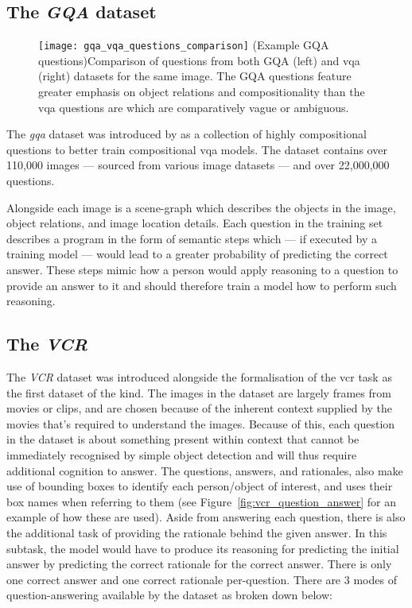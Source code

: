 \subsection{The \textit{GQA} dataset}
\label{subsec:gqa_dataset}

\begin{figure}[htbp]
    \centering
    \texttt{[image: gqa\_vqa\_questions\_comparison]}
    \captionsource(Example GQA questions){Comparison of questions from both GQA (left) and \gls{vqa} (right) datasets for the same image. The GQA questions feature greater emphasis on object relations and compositionality than the \gls{vqa} questions are which are comparatively vague or ambiguous. \label{fig:gqa_and_vqa_questions_compared}}{\citeauthor{hudson_gqa_2019}\cite{hudson_gqa_2019}}
\end{figure}

The \textit{\gls{gqa}} dataset was introduced by \citeauthor{hudson_gqa_2019}\cite{hudson_gqa_2019} as a collection of highly compositional questions to better train compositional \gls{vqa} models.
The dataset contains over 110,000 images --- sourced from various image datasets --- and over 22,000,000 questions.

Alongside each image is a scene-graph which describes the objects in the image, object relations, and image location details.
Each question in the training set describes a program in the form of semantic steps which --- if executed by a training model --- would lead to a greater probability of predicting the correct answer.
These steps mimic how a person would apply reasoning to a question to provide an answer to it and should therefore train a model how to perform such reasoning.

\subsection{The \textit{VCR}}
\label{subsec:vcr_dataset}

The \textit{VCR} dataset \cite{zellers_recognition_2019} was introduced alongside the formalisation of the \gls{vcr} task as the first dataset of the kind.
The images in the dataset are largely frames from movies or clips, and are chosen because of the inherent context supplied by the movies that's required to understand the images.
Because of this, each question in the dataset is about something present within context that cannot be immediately recognised by simple object detection and will thus require additional cognition to answer.
The questions, answers, and rationales, also make use of bounding boxes to identify each person/object of interest, and uses their box names when referring to them (see Figure~\ref{fig:vcr_question_answer} for an example of how these are used).
Aside from answering each question, there is also the additional task of providing the rationale behind the given answer.
In this subtask, the model would have to produce its reasoning for predicting the initial answer by predicting the correct rationale for the correct answer.
There is only one correct answer and one correct rationale per-question.
There are 3 modes of question-answering available by the dataset as broken down below:

